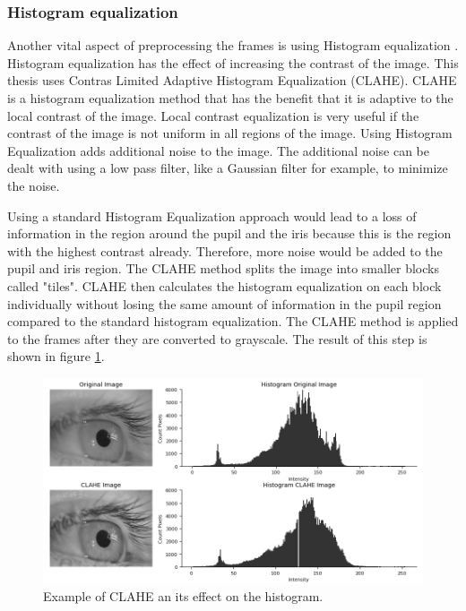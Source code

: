 \subsubsection{Histogram equalization }
Another vital aspect of preprocessing the frames is using Histogram equalization \cite{noauthor_opencv_2015}. Histogram equalization has the effect of increasing the contrast of the image. This thesis uses Contras Limited Adaptive Histogram Equalization (CLAHE). CLAHE is a histogram equalization method that has the benefit that it is adaptive to the local contrast of the image. Local contrast equalization is very useful if the contrast of the image is not uniform in all regions of the image. Using Histogram Equalization adds additional noise to the image. The additional noise can be dealt with using a low pass filter, like a Gaussian filter for example, to minimize the noise. 

 Using a standard Histogram Equalization approach would lead to a loss of information in the region around the pupil and the iris because this is the region with the highest contrast already. Therefore, more noise would be added to the pupil and iris region. The CLAHE method splits the image into smaller blocks called "tiles". CLAHE then calculates the histogram equalization on each block individually without losing the same amount of information in the pupil region compared to the standard histogram equalization. The CLAHE method is applied to the frames after they are converted to grayscale. The result of this step is shown in figure \ref{fig:clahe}. 

\begin{figure}[h]
    \centering
    \includegraphics[width=1\textwidth]{plots/clahe.png}
    \caption{Example of CLAHE an its effect on the histogram.}
    \label{fig:clahe}
\end{figure}

